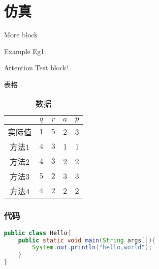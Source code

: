 \section{仿真}

\begin{frame}{More block}
    \begin{exampleblock}{Example}
    Eg1.
    \end{exampleblock}
    \begin{alertblock}{Attention}
        Test block!
    \end{alertblock}
\end{frame}

\begin{frame}{表格}
    \begin{table}[]
        \centering
        \caption{数据}
        \label{tab1}
        \begin{tabular}{@{}ccccc@{}}
        \toprule
                    & $q$         & $r$         & $a$ & $p$           \\ \midrule
        实际值         & $1$  & $5$  & 2   & 3  \\
        方法1          & $4$ & $3$ & 1 & 1\\
        方法2        & $4$ & $3$ & 2 & 2\\
        方法3 & $5$ & $2$ & 3 & 3\\
        方法4          & $4$ & $2$ & 2 & 2\\ \bottomrule
        \end{tabular}
    \end{table}
\end{frame}

\begin{frame}[fragile]
    \frametitle{代码}
    \begin{lstlisting}[language=java]
public class Hello{
    public static void main(String args[]){
        System.out.println("hello,world");
    }
}\end{lstlisting}
\end{frame}
